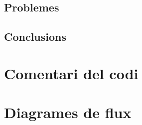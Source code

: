 \documentclass{../pdae} %
\begin{document}
\subsection{Problemes}

\subsection{Conclusions}

\section{Comentari del codi}

\section{Diagrames de flux}
\end{document}
